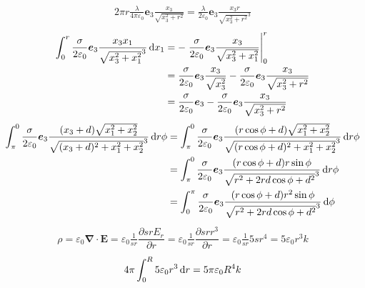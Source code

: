 \begin{align*}
    2\pi r\frac{\lambda}{4\pi\varepsilon_0}\boldsymbol e_3\frac{x_3}{\sqrt{x_3^2+r^2}}
    =\frac{\lambda}{2\varepsilon_0}\boldsymbol e_3\frac{x_3r}{\sqrt{x_3^2+r^2}^3}
\end{align*}
\begin{align*}
    \int_0^r\frac{\sigma}{2\varepsilon_0}\boldsymbol e_3\frac{x_3x_1}{\sqrt{x_3^2+x_1^2}^3}\dif x_1&
    =-\left.\frac{\sigma }{2\varepsilon_0}\boldsymbol e_3\frac{x_3}{\sqrt{x_3^2+x_1^2}}\right|_0^r\\&
    =\frac{\sigma }{2\varepsilon_0}\boldsymbol e_3\frac{x_3}{\sqrt{x_3^2}}
    -\frac{\sigma }{2\varepsilon_0}\boldsymbol e_3\frac{x_3}{\sqrt{x_3^2+r^2}}\\&
    =\frac{\sigma }{2\varepsilon_0}\boldsymbol e_3
    -\frac{\sigma }{2\varepsilon_0}\boldsymbol e_3\frac{x_3}{\sqrt{x_3^2+r^2}}
\end{align*}
\begin{align*}
    \int_{\pi}^{0}\frac{\sigma}{2\varepsilon_0}\boldsymbol e_3\frac{(x_3+d)\sqrt{x_1^2+x_2^2}}{\sqrt{(x_3+d)^2+x_1^2+x_2^2}^3}\dif r\phi
    &=\int_{\pi}^{0}\frac{\sigma}{2\varepsilon_0}\boldsymbol e_3\frac{(r\cos\phi+d)\sqrt{x_1^2+x_2^2}}{\sqrt{(r\cos\phi+d)^2+x_1^2+x_2^2}^3}\dif r\phi\\
    &=\int_{\pi}^{0}\frac{\sigma}{2\varepsilon_0}\boldsymbol e_3\frac{(r\cos\phi+d)r\sin\phi}{\sqrt{r^2+2rd\cos\phi+d^2}^3}\dif r\phi\\
    &=\int_{0}^{\pi}\frac{\sigma}{2\varepsilon_0}\boldsymbol e_3\frac{(r\cos\phi+d)r^2\sin\phi}{\sqrt{r^2+2rd\cos\phi+d^2}^3}\dif \phi
\end{align*}
\begin{align*}
    \rho=\varepsilon_0\boldsymbol{\nabla}\cdot\boldsymbol{E}
    =\varepsilon_0\frac{1}{sr}\dfrac{\partial srE_r}{\partial r}
    =\varepsilon_0\frac{1}{sr}\dfrac{\partial srr^3}{\partial r}
    =\varepsilon_0\frac{1}{sr}{5sr^4}
    =5\varepsilon_0{r^3}k
\end{align*}
\begin{align*}
    4\pi\int_{0}^{R}5\varepsilon_0{r^3}\dif r=5\pi\varepsilon_0{R^4}k
\end{align*}
